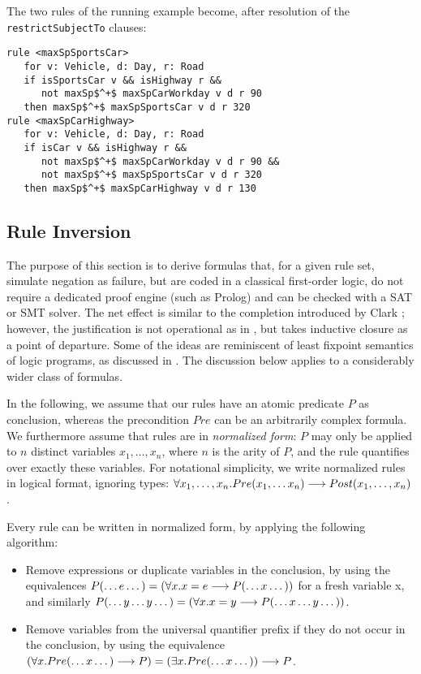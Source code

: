 \begin{example} The two rules of the running example become, after resolution
  of the \texttt{restrictSubjectTo} clauses:
\begin{lstlisting}[mathescape=true]
rule <maxSpSportsCar>
   for v: Vehicle, d: Day, r: Road
   if isSportsCar v && isHighway r &&
      not maxSp$^+$ maxSpCarWorkday v d r 90
   then maxSp$^+$ maxSpSportsCar v d r 320
rule <maxSpCarHighway>
   for v: Vehicle, d: Day, r: Road
   if isCar v && isHighway r &&
      not maxSp$^+$ maxSpCarWorkday v d r 90 &&
      not maxSp$^+$ maxSpSportsCar v d r 320
   then maxSp$^+$ maxSpCarHighway v d r 130
\end{lstlisting}
\end{example}

\subsection{Rule Inversion}\label{sec:rule_inversion}

The purpose of this section is to derive formulas that, for a given rule set,
simulate negation as failure, but are coded in a classical first-order logic,
do not require a dedicated proof engine (such as Prolog) and can be checked
with a SAT or SMT solver. The net effect is similar to the completion
introduced by Clark \cite{clark_NegAsFailure_1978}; however, the justification
is not operational as in \cite{clark_NegAsFailure_1978}, but takes inductive
closure as a point of departure. Some of the ideas are reminiscent of least
fixpoint semantics of logic programs, as discussed in
\cite{falaschi_etal_declarative_logic_langauges_1989,fages_consistency_clark_completion_1994}.
The discussion below applies to a considerably wider class of formulas.

In the following, we assume that our rules have an atomic predicate $P$ as
conclusion, whereas the precondition $Pre$ can be an arbitrarily complex
formula.  We furthermore assume that rules are in \emph{normalized form}: $P$
may only be applied to $n$ distinct variables $x_1, \dots, x_n$, where $n$ is
the arity of $P$, and the rule quantifies over exactly these variables.
For notational simplicity, we write normalized rules in logical format,
ignoring types:
$\forall x_1, \dots, x_n. Pre(x_1, \dots x_n) \longrightarrow Post(x_1, \dots, x_n)$.

Every rule can be written in normalized form, by applying the following
algorithm:
\begin{itemize}
\item Remove expressions or duplicate variables in the conclusion, by using
  the equivalences $P(\dots e \dots) = (\forall x. x = e \longrightarrow P(\dots x
  \dots))$ for a fresh variable x, and similarly $P(\dots y \dots y \dots) =
  (\forall x. x = y   \longrightarrow P(\dots x \dots y \dots))$.
\item Remove variables from the universal quantifier prefix if they do not
  occur in the conclusion, by using the equivalence
  $(\forall x. Pre(\dots x \dots) \longrightarrow P) = (\exists x. Pre(\dots x \dots))
  \longrightarrow P$.
\end{itemize}

